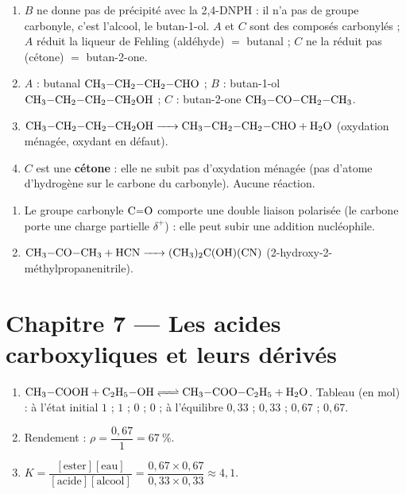 \begin{enumerate}[label=\arabic*)]
\item $B$ ne donne pas de précipité avec la 2,4-DNPH : il n'a pas de groupe carbonyle,
c'est l'alcool, le butan-1-ol. $A$ et $C$ sont des composés carbonylés ; $A$ réduit la
liqueur de Fehling (aldéhyde) $= $ butanal ; $C$ ne la réduit pas (cétone) $= $ butan-2-one.
\item $A$ : butanal $\ce{CH3-CH2-CH2-CHO}$ ; $B$ : butan-1-ol $\ce{CH3-CH2-CH2-CH2OH}$ ;
$C$ : butan-2-one $\ce{CH3-CO-CH2-CH3}$.
\item $\ce{CH3-CH2-CH2-CH2OH -> CH3-CH2-CH2-CHO + H2O}$ (oxydation ménagée, oxydant en défaut).
\item $C$ est une \textbf{cétone} : elle ne subit pas d'oxydation ménagée (pas
d'atome d'hydrogène sur le carbone du carbonyle). Aucune réaction.
\end{enumerate}

\begin{enumerate}[label=\arabic*)]
\item Le groupe carbonyle $\ce{C=O}$ comporte une double liaison polarisée (le carbone
porte une charge partielle $\delta^+$) : elle peut subir une addition nucléophile.
\item $\ce{CH3-CO-CH3 + HCN -> (CH3)2C(OH)(CN)}$ (2-hydroxy-2-méthylpropanenitrile).
\end{enumerate}

\section{Chapitre 7 — Les acides carboxyliques et leurs dérivés}

\begin{enumerate}[label=\arabic*)]
\item $\ce{CH3-COOH + C2H5-OH <=> CH3-COO-C2H5 + H2O}$. Tableau (en mol) : à l'état
initial $1$ ; $1$ ; $0$ ; $0$ ; à l'équilibre $0{,}33$ ; $0{,}33$ ; $0{,}67$ ; $0{,}67$.
\item Rendement : $\rho = \dfrac{0{,}67}{1} = \SI{67}{\percent}$.
\item $K = \dfrac{[\text{ester}][\text{eau}]}{[\text{acide}][\text{alcool}]} =
\dfrac{0{,}67\times0{,}67}{0{,}33\times0{,}33} \approx 4{,}1$.
\end{enumerate}

